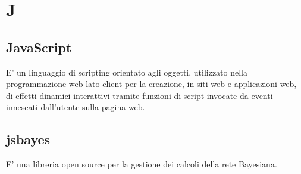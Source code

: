 \section*{J}

\subsection{JavaScript}
E' un linguaggio di scripting orientato agli oggetti, utilizzato nella programmazione web lato client per la creazione, in siti web e 
applicazioni web, di effetti dinamici interattivi tramite funzioni di script invocate da eventi innescati dall'utente sulla pagina web.

\subsection{jsbayes}
E' una libreria open source per la gestione dei calcoli della rete Bayesiana.